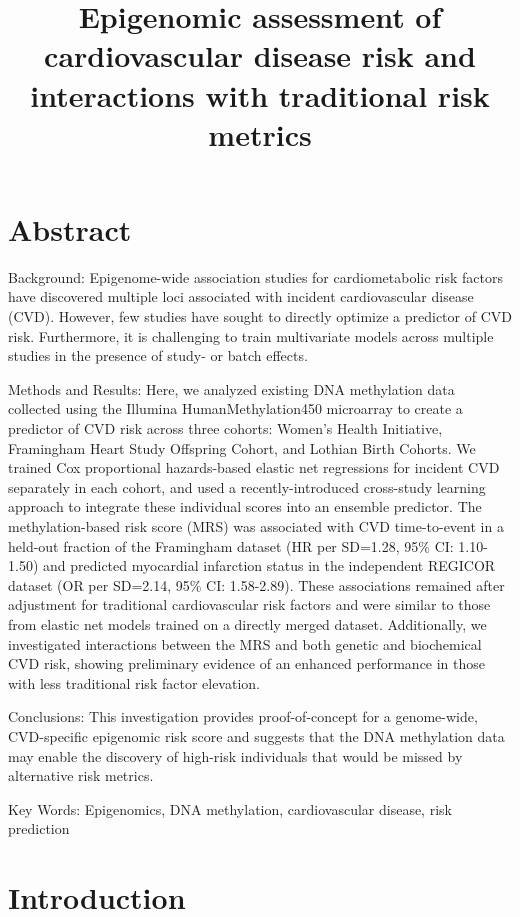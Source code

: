 \documentclass[]{article}
\title{Epigenomic assessment of cardiovascular disease risk and interactions
with traditional risk metrics}
\author{}
\date{}
\begin{document}
\maketitle

\hypertarget{abstract}{%
\section{Abstract}\label{abstract}}

Background: Epigenome-wide association studies for cardiometabolic risk
factors have discovered multiple loci associated with incident
cardiovascular disease (CVD). However, few studies have sought to
directly optimize a predictor of CVD risk. Furthermore, it is
challenging to train multivariate models across multiple studies in the
presence of study- or batch effects.

Methods and Results: Here, we analyzed existing DNA methylation data
collected using the Illumina HumanMethylation450 microarray to create a
predictor of CVD risk across three cohorts: Women's Health Initiative,
Framingham Heart Study Offspring Cohort, and Lothian Birth Cohorts. We
trained Cox proportional hazards-based elastic net regressions for
incident CVD separately in each cohort, and used a recently-introduced
cross-study learning approach to integrate these individual scores into
an ensemble predictor. The methylation-based risk score (MRS) was
associated with CVD time-to-event in a held-out fraction of the
Framingham dataset (HR per SD=1.28, 95\% CI: 1.10-1.50) and predicted
myocardial infarction status in the independent REGICOR dataset (OR per
SD=2.14, 95\% CI: 1.58-2.89). These associations remained after
adjustment for traditional cardiovascular risk factors and were similar
to those from elastic net models trained on a directly merged dataset.
Additionally, we investigated interactions between the MRS and both
genetic and biochemical CVD risk, showing preliminary evidence of an
enhanced performance in those with less traditional risk factor
elevation.

Conclusions: This investigation provides proof-of-concept for a
genome-wide, CVD-specific epigenomic risk score and suggests that the
DNA methylation data may enable the discovery of high-risk individuals
that would be missed by alternative risk metrics.

Key Words: Epigenomics, DNA methylation, cardiovascular disease, risk
prediction

\hypertarget{introduction}{%
\section{Introduction}\label{introduction}}
\end{document}
